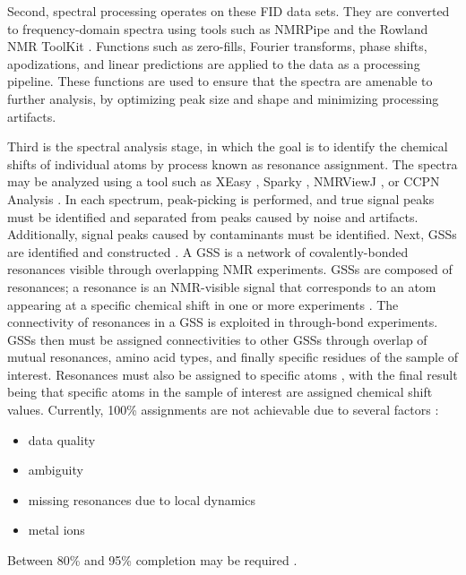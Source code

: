 Second, spectral processing operates on these FID data sets.  They are 
converted to frequency-domain spectra using tools such as NMRPipe \cite{nmrpipe}
and the Rowland NMR ToolKit \cite{rnmrtk}.  Functions such as 
zero-fills, Fourier transforms, phase shifts, apodizations, and linear 
predictions are applied to the data as a processing pipeline.  These 
functions are used to ensure that the spectra are amenable to further 
analysis, by optimizing peak size and shape and minimizing processing 
artifacts.

Third is the spectral analysis stage, in which the goal is to identify the 
chemical shifts of individual atoms by process known as resonance assignment.
The spectra may be analyzed using a tool such as XEasy \cite{xeasy}, 
Sparky \cite{sparky}, NMRViewJ \cite{nmrviewj}, or CCPN Analysis \cite{ccpn}.  
In each spectrum, peak-picking is performed, and true signal peaks must 
be identified and separated from peaks caused by noise and artifacts.  
Additionally, signal peaks caused by contaminants must be identified.  
Next, GSSs are identified and constructed \cite{ccpn}. 
A GSS is a network of covalently-bonded resonances visible through 
overlapping NMR experiments.  GSSs are composed of resonances; a 
resonance is an NMR-visible signal that corresponds to an atom appearing 
at a specific chemical shift in one or more experiments \cite{ccpn}.  
The connectivity of resonances in a GSS is exploited 
in through-bond experiments.  GSSs then must be assigned 
connectivities to other GSSs through overlap of mutual resonances, 
amino acid types, and finally specific residues of the sample of interest. 
Resonances must also be assigned to specific atoms \cite{ccpn}, 
with the final result being that specific atoms in the sample of interest 
are assigned chemical shift values.  Currently, 100\% assignments are not 
achievable due to several factors \cite{guerry2011automated}: 
\begin{itemize}
  \item data quality
  \item ambiguity
  \item missing resonances due to local dynamics
  \item metal ions
\end{itemize}
Between 80\% and 95\% completion may be required \cite{williamson2009automated}.

